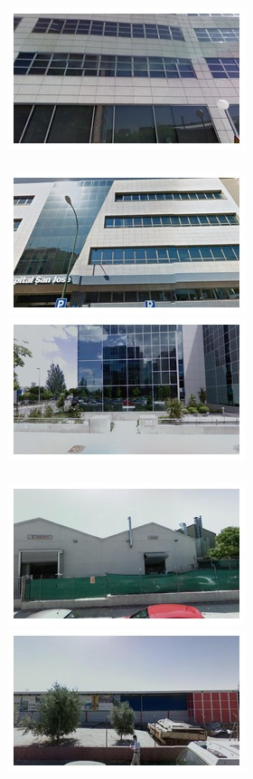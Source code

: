 \begin{figure}
\begin{minipage}{\linewidth}
\begin{minipage}{0.3\linewidth}
      \includegraphics[width=0.49\linewidth]{imgs/arch/mosaicsS4/mosaic0012.jpg}
      \\ \vspace{-3mm} \\
      \includegraphics[width=0.49\linewidth]{imgs/arch/mosaicsS4/mosaic0014.jpg}
      \includegraphics[width=0.49\linewidth]{imgs/arch/mosaicsS4/mosaic0018.jpg}
      \\ \vspace{-3mm} \\
      \includegraphics[width=0.49\linewidth]{imgs/arch/mosaicsS4/mosaic0019.jpg}
      \includegraphics[width=0.49\linewidth]{imgs/arch/mosaicsS4/mosaic0021.jpg}

\end{minipage}
\end{minipage}
\end{figure}
